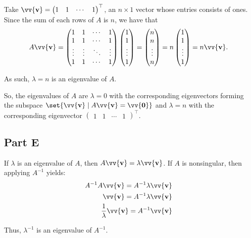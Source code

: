 \documentclass[12pt]{article}
\newcommand{\vect}[1]{\vv{\mathbf{#1}}}
\begin{document}
Take $\vect{v} = \begin{pmatrix}
    1 & 1 & \cdots & 1
\end{pmatrix}^\top$, an $n\times1$ vector whose entries consists of ones. Since the sum of each rows of $A$ is $n$, we have that
$$
A\vect{v}
= \begin{pmatrix}
    1 & 1 & \cdots & 1 \\
    1 & 1 & \cdots & 1 \\
    \vdots & \vdots & \ddots & \vdots \\
    1 & 1 & \cdots & 1
\end{pmatrix}
\begin{pmatrix}
    1 \\ 1 \\ \vdots \\ 1
\end{pmatrix}
= \begin{pmatrix}
    n \\ n \\ \vdots \\ n
\end{pmatrix}
= n \begin{pmatrix}
    1 \\ 1 \\ \vdots \\ 1
\end{pmatrix}
= n\vect{v}.
$$

As such, $\lambda=n$ is an eigenvalue of $A$.

So, the eigenvalues of $A$ are $\lambda=0$ with the corresponding eigenvectors forming the subspace $\set{\vect{v} \mid A\vect{v}=\vect{0}}$ and $\lambda=n$ with the corresponding eigenvector $\begin{pmatrix}
    1 & 1 & \cdots & 1
\end{pmatrix}^\top$.

\subsection*{Part E}

If $\lambda$ is an eigenvalue of $A$, then $A\vect{v}=\lambda\vect{v}$. If $A$ is nonsingular, then applying $A^{-1}$ yields:
\begin{align*}
    A^{-1}A\vect{v} = A^{-1}\lambda\vect{v} \\
    \vect{v} = A^{-1}\lambda\vect{v} \\
    \frac{1}{\lambda}\vect{v} = A^{-1}\vect{v} \\
\end{align*}

Thus, $\lambda^{-1}$ is an eigenvalue of $A^{-1}$.
\end{document}
